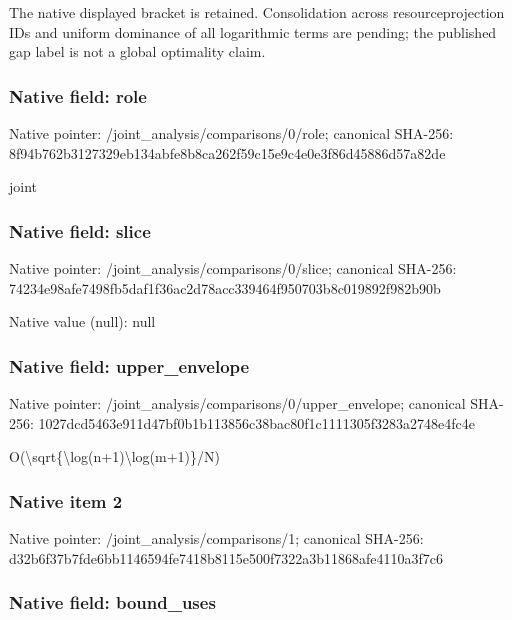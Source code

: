 \documentclass[10pt,a4paper]{article}
\begin{document}
The native displayed bracket is retained. Consolidation across resourceprojection IDs and uniform dominance of all logarithmic terms are pending; the published gap label is not a global optimality claim.


\subsubsection{Native field: role}


Native pointer: /joint\_analysis/comparisons/0/role; canonical SHA-256: 8f94b762b3127329eb134abf\allowbreak{}e8b8ca262f59c15e9c4e0e3f\allowbreak{}86d45886d57a82de


joint


\subsubsection{Native field: slice}


Native pointer: /joint\_analysis/comparisons/0/slice; canonical SHA-256: 74234e98afe7498fb5daf1f3\allowbreak{}6ac2d78acc339464f950703b\allowbreak{}8c019892f982b90b



Native value (null): null



\subsubsection{Native field: upper\_envelope}


Native pointer: /joint\_analysis/comparis\allowbreak{}ons/0/upper\_envelope; canonical SHA-256: 1027dcd5463e911d47bf0b1b\allowbreak{}113856c38bac80f1c1111305\allowbreak{}f3283a2748e4fc4e


O(\textbackslash{}sqrt\{\textbackslash{}log(n+1)\textbackslash{}log(m+1)\}/N)


\subsubsection{Native item 2}


Native pointer: /joint\_analysis/comparisons/1; canonical SHA-256: d32b6f37b7fde6bb1146594f\allowbreak{}e7418b8115e500f7322a3b11\allowbreak{}868afe4110a3f7c6



\subsubsection{Native field: bound\_uses}
\end{document}
